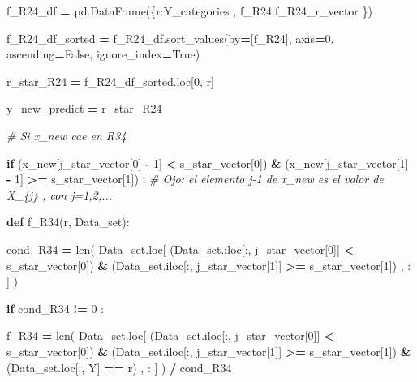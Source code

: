 \documentclass[
  11pt,
  a4paper,
]{article}
\newenvironment{Shaded}{\begin{snugshade}}{\end{snugshade}}
\newcommand{\BuiltInTok}[1]{#1}
\newcommand{\CommentTok}[1]{\textcolor[rgb]{0.56,0.35,0.01}{\textit{#1}}}
\newcommand{\ControlFlowTok}[1]{\textcolor[rgb]{0.13,0.29,0.53}{\textbf{#1}}}
\newcommand{\DecValTok}[1]{\textcolor[rgb]{0.00,0.00,0.81}{#1}}
\newcommand{\KeywordTok}[1]{\textcolor[rgb]{0.13,0.29,0.53}{\textbf{#1}}}
\newcommand{\NormalTok}[1]{#1}
\newcommand{\OperatorTok}[1]{\textcolor[rgb]{0.81,0.36,0.00}{\textbf{#1}}}
\newcommand{\StringTok}[1]{\textcolor[rgb]{0.31,0.60,0.02}{#1}}
\newcommand{\VariableTok}[1]{\textcolor[rgb]{0.00,0.00,0.00}{#1}}
\begin{document}
\begin{Shaded}
\begin{Highlighting}[]
\NormalTok{                f\_R24\_df }\OperatorTok{=}\NormalTok{ pd.DataFrame(\{}\StringTok{\textquotesingle{}r\textquotesingle{}}\NormalTok{:Y\_categories  , }\StringTok{\textquotesingle{}f\_R24\textquotesingle{}}\NormalTok{:f\_R24\_r\_vector \})}
        
\NormalTok{                f\_R24\_df\_sorted }\OperatorTok{=}\NormalTok{ f\_R24\_df.sort\_values(by}\OperatorTok{=}\NormalTok{[}\StringTok{\textquotesingle{}f\_R24\textquotesingle{}}\NormalTok{], axis}\OperatorTok{=}\DecValTok{0}\NormalTok{, ascending}\OperatorTok{=}\VariableTok{False}\NormalTok{, ignore\_index}\OperatorTok{=}\VariableTok{True}\NormalTok{)}

\NormalTok{                r\_star\_R24 }\OperatorTok{=}\NormalTok{ f\_R24\_df\_sorted.loc[}\DecValTok{0}\NormalTok{, }\StringTok{\textquotesingle{}r\textquotesingle{}}\NormalTok{]}


\NormalTok{                y\_new\_predict }\OperatorTok{=}\NormalTok{ r\_star\_R24}



            \CommentTok{\# Si x\_new cae en R34}

            \ControlFlowTok{if}\NormalTok{ (x\_new[j\_star\_vector[}\DecValTok{0}\NormalTok{] }\OperatorTok{{-}} \DecValTok{1}\NormalTok{] }\OperatorTok{\textless{}}\NormalTok{ s\_star\_vector[}\DecValTok{0}\NormalTok{]) }\OperatorTok{\&}\NormalTok{ (x\_new[j\_star\_vector[}\DecValTok{1}\NormalTok{] }\OperatorTok{{-}} \DecValTok{1}\NormalTok{] }\OperatorTok{\textgreater{}=}\NormalTok{ s\_star\_vector[}\DecValTok{1}\NormalTok{]) :  }\CommentTok{\# Ojo: el elemento j{-}1 de x\_new es el valor de X\_\{j\} , con j=1,2,...}

                \KeywordTok{def}\NormalTok{ f\_R34(r, Data\_set):}

\NormalTok{                        cond\_R34 }\OperatorTok{=} \BuiltInTok{len}\NormalTok{( Data\_set.loc[ (Data\_set.iloc[:, j\_star\_vector[}\DecValTok{0}\NormalTok{]] }\OperatorTok{\textless{}}\NormalTok{ s\_star\_vector[}\DecValTok{0}\NormalTok{]) }\OperatorTok{\&}\NormalTok{ (Data\_set.iloc[:, j\_star\_vector[}\DecValTok{1}\NormalTok{]] }\OperatorTok{\textgreater{}=}\NormalTok{ s\_star\_vector[}\DecValTok{1}\NormalTok{]) , : ] ) }

                        \ControlFlowTok{if}\NormalTok{  cond\_R34 }\OperatorTok{!=} \DecValTok{0}\NormalTok{ :}

\NormalTok{                            f\_R34 }\OperatorTok{=} \BuiltInTok{len}\NormalTok{( Data\_set.loc[ (Data\_set.iloc[:, j\_star\_vector[}\DecValTok{0}\NormalTok{]] }\OperatorTok{\textless{}}\NormalTok{ s\_star\_vector[}\DecValTok{0}\NormalTok{]) }\OperatorTok{\&}\NormalTok{ (Data\_set.iloc[:, j\_star\_vector[}\DecValTok{1}\NormalTok{]] }\OperatorTok{\textgreater{}=}\NormalTok{ s\_star\_vector[}\DecValTok{1}\NormalTok{]) }\OperatorTok{\&}\NormalTok{ (Data\_set.loc[:, }\StringTok{\textquotesingle{}Y\textquotesingle{}}\NormalTok{] }\OperatorTok{==}\NormalTok{ r) , : ] ) }\OperatorTok{/}\NormalTok{ cond\_R34}


\end{Highlighting}
\end{Shaded}
\end{document}
